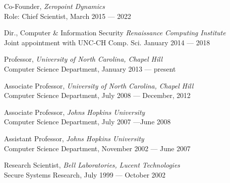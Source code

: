 \documentclass[11pt]{article}
\newcommand{\ignore}[1]{}
\newcommand{\alignright}[1]{\noindent \parbox[t]{85pt} {\hspace{79pt}} \parbox[t]{400pt}{#1} \vspace{0.5\baselineskip} }
\newcommand{\headingsgap}{\vspace{\baselineskip}}
\newenvironment{cvhanglist}{%
  \begin{list}{}{%
    \setlength{\leftmargin}{1.8em}%
    \setlength{\itemindent}{-1.8em}%
    \setlength{\labelwidth}{0pt}%
    \setlength{\labelsep}{0pt}%
    \setlength{\itemsep}{0.35em}%
    \setlength{\parsep}{0pt}%
    \setlength{\topsep}{0.25em}%
  }%
}{\end{list}}
\begin{document}
\alignright{{\sc Co-Founder}, \hfill {\it Zeropoint Dynamics} \\ Role: Chief Scientist, \hfill
 \hfill March 2015 --- 2022}

\alignright{{\sc Dir., Computer \& Information Security} \hfill {\it Renaissance Computing Institute}
 \\Joint appointment with UNC-CH Comp. Sci. \hfill January 2014 --- 2018
}

\alignright{{\sc Professor,} \hfill {\it University of North Carolina, Chapel Hill}
	\\ { Computer Science Department}, \hfill January 2013 --- present
}

\alignright{{\sc Associate Professor,} \hfill {\it University of North Carolina, Chapel Hill}
	\\ { Computer Science Department}, \hfill July 2008 --- December, 2012
}

\alignright{{\sc Associate Professor,} \hfill {\it Johns Hopkins University}
	\\ { Computer Science Department}, \hfill July 2007 ---June 2008
}

\alignright{{\sc Assistant Professor,} \hfill {\it Johns Hopkins University}
	\\ { Computer Science Department}, \hfill November 2002 --- June 2007
}


\alignright{{\sc Research Scientist,} \hfill {\it Bell Laboratories, Lucent Technologies}\\
	{ Secure Systems Research}, \hfill July 1999 --- October 2002
\ignore{
 \begin{cvhanglist}
 \item{
Conducted research on a myriad of topics in applied security including mobile code security, the generation of cryptographic keys from biometrics, web privacy, electronic commerce, and countermeasures for distributed denial of service attacks.
 }
	\end{cvhanglist}}
}
\end{document}
